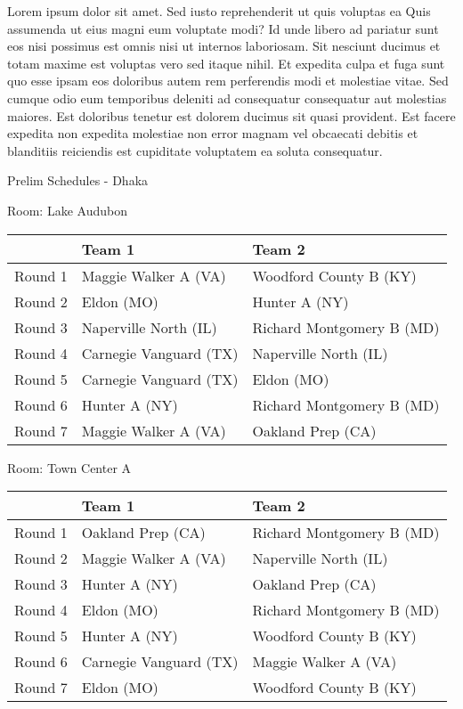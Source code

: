 \documentclass{article}%
\begin{document}
Lorem ipsum dolor sit amet. Sed iusto reprehenderit ut quis voluptas ea Quis assumenda ut eius magni eum voluptate modi? Id unde libero ad pariatur sunt eos nisi possimus est omnis nisi ut internos laboriosam. Sit nesciunt ducimus et totam maxime est voluptas vero sed itaque nihil. Et expedita culpa et fuga sunt quo esse ipsam eos doloribus autem rem perferendis modi et molestiae vitae.\newline%
\newline%
Sed cumque odio eum temporibus deleniti ad consequatur consequatur aut molestias maiores. Est doloribus tenetur est dolorem ducimus sit quasi provident. Est facere expedita non expedita molestiae non error magnam vel obcaecati debitis et blanditiis reiciendis est cupiditate voluptatem ea soluta consequatur.%
\newpage%
\begin{center}%
\begin{Huge}%
Prelim Schedules {-} Dhaka%
\end{Huge}%
\end{center}%
\begin{flushleft}%
\begin{Large}%
Room: Lake Audubon%
\end{Large}%
\end{flushleft}%
\begin{tabularx}{\textwidth}{|c|Y|Y|}%
\hline%
&Team 1&Team 2\\%
\hline%
Round 1&Maggie Walker A (VA)&Woodford County B (KY)\\%
Round 2&Eldon (MO)&Hunter A (NY)\\%
Round 3&Naperville North (IL)&Richard Montgomery B (MD)\\%
Round 4&Carnegie Vanguard (TX)&Naperville North (IL)\\%
Round 5&Carnegie Vanguard (TX)&Eldon (MO)\\%
Round 6&Hunter A (NY)&Richard Montgomery B (MD)\\%
Round 7&Maggie Walker A (VA)&Oakland Prep (CA)\\%
\hline%
\end{tabularx}%
\vspace*{8pt}%
\linebreak%
\begin{flushleft}%
\begin{Large}%
Room: Town Center A%
\end{Large}%
\end{flushleft}%
\begin{tabularx}{\textwidth}{|c|Y|Y|}%
\hline%
&Team 1&Team 2\\%
\hline%
Round 1&Oakland Prep (CA)&Richard Montgomery B (MD)\\%
Round 2&Maggie Walker A (VA)&Naperville North (IL)\\%
Round 3&Hunter A (NY)&Oakland Prep (CA)\\%
Round 4&Eldon (MO)&Richard Montgomery B (MD)\\%
Round 5&Hunter A (NY)&Woodford County B (KY)\\%
Round 6&Carnegie Vanguard (TX)&Maggie Walker A (VA)\\%
Round 7&Eldon (MO)&Woodford County B (KY)\\%
\hline%
\end{tabularx}%
\end{document}
